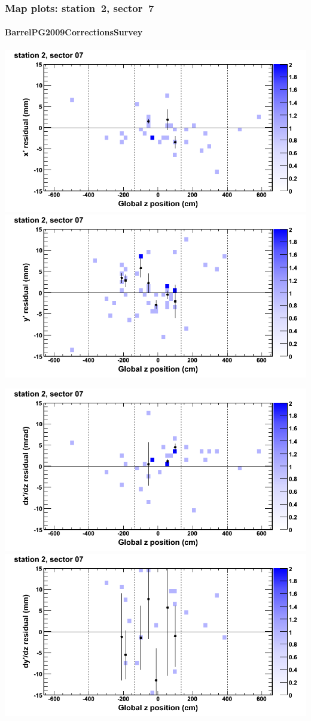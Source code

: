 \documentclass[compress]{beamer}
\begin{document}
\begin{frame}
\frametitle{Map plots: station~2, sector~7}
\framesubtitle{BarrelPG2009CorrectionsSurvey}
\includegraphics[width=0.5\linewidth]{mapplots_01/DTvsz_st2sec07_x.png}
\includegraphics[width=0.5\linewidth]{mapplots_01/DTvsz_st2sec07_y.png}

\includegraphics[width=0.5\linewidth]{mapplots_01/DTvsz_st2sec07_dxdz.png}
\includegraphics[width=0.5\linewidth]{mapplots_01/DTvsz_st2sec07_dydz.png}
\end{frame}
\end{document}
